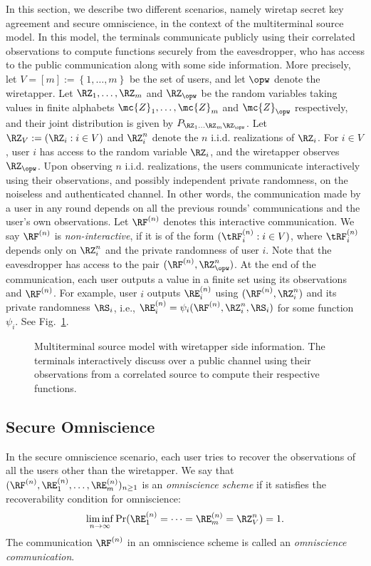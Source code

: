In this section, we describe two different scenarios, namely wiretap secret key agreement and secure omniscience, in the context of the multiterminal source model. In this model,  the terminals communicate publicly using their correlated observations to compute functions securely from the eavesdropper, who has access to the public communication along with some side information.  More precisely, let $V=[m]:=\left\lbrace1, \ldots, m\right\rbrace$ be the set of users,  and let $\opw$ denote the wiretapper.  Let  $\RZ_1,\ldots, \RZ_m$ and $\RZ_{\opw}$ be the random variables  taking values in finite alphabets $\mc{Z}_1,\ldots, \mc{Z}_m$ and $\mc{Z}_{\opw}$ respectively, and their joint distribution is given by $P_{\RZ_1 \ldots \RZ_m \RZ_{\opw}}$. Let $\RZ_V := (\RZ_i: i \in V)$ and $\RZ_i^n$ denote the $n$ i.i.d. realizations  of $\RZ_i$. For $i \in V$, user $i$ has access to the random variable $\RZ_i$, and the wiretapper observes $\RZ_{\opw}$. Upon observing $n$ i.i.d. realizations, the users communicate interactively using their observations, and possibly independent private randomness, on the noiseless and authenticated channel. In other words, the communication made by a user in any round depends on all the previous rounds' communications and  the user's own observations.  Let $\RF^{(n)}$ denotes this interactive communication. We say $\RF^{(n)}$ is \emph{non-interactive}, if it is of the form $(\tRF_i^{(n)}: i \in V)$, where $\tRF_i^{(n)}$ depends only on $\RZ_i^n$ and the  private randomness of user $i$. Note that the eavesdropper has access to the pair $(\RF^{(n)}, \RZ_{\opw}^n)$. At the end of the communication, each user outputs a value in a finite set using its observations and $\RF^{(n)}$. For example, user $i$ outputs $\RE_i^{(n)}$ using $(\RF^{(n)}, \RZ_i^n)$ and its private randomness { $\RS_i$, i.e., $\RE_i^{(n)} = \psi_i(\RF^{(n)}, \RZ_i^n, \RS_i)$ for some function $\psi_i$}. See Fig.~\ref{fig:system}.
\begin{figure}[h]
\centering
\resizebox{0.85\width}{!}{}
\caption{Multiterminal source model with wiretapper side information. The terminals interactively discuss over a public channel using their observations from a correlated source to  compute their respective functions.}
\label{fig:system}
 \end{figure}
\subsection{Secure Omniscience}\label{subsec:omniscience}
In the secure omniscience scenario, each user tries to recover the observations of all the users other than the wiretapper. We say that $(\RF^{(n)}, \RE_1^{(n)}, \ldots, \RE_m^{(n)})_ {n \geq 1}$  is an \emph{omniscience scheme} if it satisfies the recoverability condition for omniscience:
\begin{align}\label{eq:omn:recoverability}
\liminf_{n \to \infty} \Pr(\RE_1^{(n)} = \dots =\RE_m^{(n)} = \RZ_V^n) = 1.
\end{align}
The communication $\RF^{(n)}$ in an omniscience scheme is called an \emph{omniscience communication}.

